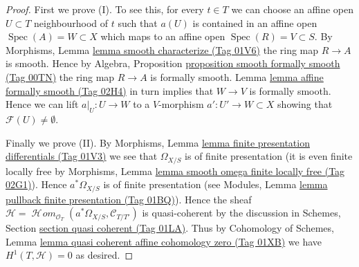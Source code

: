 \documentclass{amsart}
\theoremstyle{plain}
\theoremstyle{definition}
\theoremstyle{remark}
\numberwithin{equation}{subsection}
\def\Spec{\mathop{\mathrm{Spec}}}
\def\SheafHom{\mathop{\mathcal{H}\!\mathit{om}}\nolimits}
\begin{document}
\begin{proof}
\medskip\noindent
First we prove (I). To see this, for every $t \in T$ we can
choose an affine open $U \subset T$ neighbourhood of $t$
such that $a(U)$ is contained
in an affine open $\Spec(A) = W \subset X$
which maps to an affine open $\Spec(R) = V \subset S$.
By Morphisms, Lemma \href{https://stacks.math.columbia.edu/tag/01V6}{lemma smooth characterize (Tag 01V6)}
the ring map $R \to A$ is smooth.
Hence by Algebra, Proposition \href{https://stacks.math.columbia.edu/tag/00TN}{proposition smooth formally smooth (Tag 00TN)}
the ring map $R \to A$ is formally smooth.
Lemma \href{https://stacks.math.columbia.edu/tag/02H4}{lemma affine formally smooth (Tag 02H4)}
in turn implies that $W \to V$ is formally smooth.
Hence we can lift $a|_U : U \to W$ to a $V$-morphism
$a' : U' \to W \subset X$ showing that $\mathcal{F}(U) \not = \emptyset$.

\medskip\noindent
Finally we prove (II).
By Morphisms, Lemma \href{https://stacks.math.columbia.edu/tag/01V3}{lemma finite presentation differentials (Tag 01V3)}
we see that $\Omega_{X/S}$ is of finite presentation
(it is even finite locally free by
Morphisms, Lemma \href{https://stacks.math.columbia.edu/tag/02G1}{lemma smooth omega finite locally free (Tag 02G1)}).
Hence $a^*\Omega_{X/S}$ is of finite presentation (see
Modules, Lemma \href{https://stacks.math.columbia.edu/tag/01BQ}{lemma pullback finite presentation (Tag 01BQ)}).
Hence the sheaf
$\mathcal{H} =
\SheafHom_{\mathcal{O}_T}(a^*\Omega_{X/S}, \mathcal{C}_{T/T'})$
is quasi-coherent by the discussion in
Schemes, Section \href{https://stacks.math.columbia.edu/tag/01LA}{section quasi coherent (Tag 01LA)}.
Thus by Cohomology of Schemes, Lemma
\href{https://stacks.math.columbia.edu/tag/01XB}{lemma quasi coherent affine cohomology zero (Tag 01XB)}
we have $H^1(T, \mathcal{H}) = 0$ as desired.
\end{proof}
\end{document}
